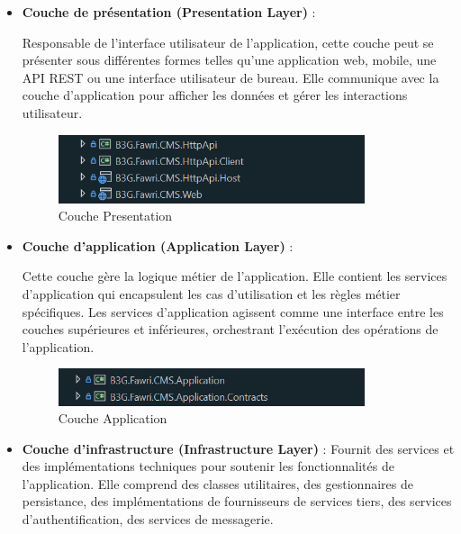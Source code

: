 \begin{itemize}
    \item \textbf{Couche de présentation (Presentation Layer)} :

          Responsable de l'interface utilisateur de l'application, cette couche peut se présenter sous différentes formes telles qu'une application web, mobile, une API REST ou une interface utilisateur de bureau. Elle communique avec la couche d'application pour afficher les données et gérer les interactions utilisateur.\\

          \begin{figure}[H]
              \centering
              \includegraphics[width=9cm]{Figures/presentation layer.PNG}
              \caption{Couche Presentation}
          \end{figure}

    \item \textbf{Couche d'application (Application Layer)} :

          Cette couche gère la logique métier de l'application. Elle contient les services d'application qui encapsulent les cas d'utilisation et les règles métier spécifiques. Les services d'application agissent comme une interface entre les couches supérieures et inférieures, orchestrant l'exécution des opérations de l'application.



          \begin{figure}[H]
              \centering
              \includegraphics[width=9cm]{Figures/application layer.PNG}
              \caption{Couche Application}
          \end{figure}





    \item \textbf{Couche d'infrastructure (Infrastructure Layer)} :
          Fournit des services et des implémentations techniques pour soutenir les fonctionnalités de l'application. Elle comprend des classes utilitaires, des gestionnaires de persistance, des implémentations de fournisseurs de services tiers, des services d'authentification, des services de messagerie.


\end{itemize}
